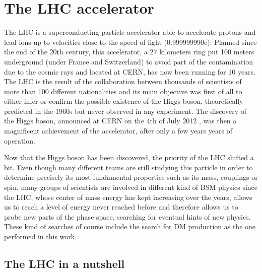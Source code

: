 \documentclass[a4paper, 10pt, openright]{report}
\begin{document}
\section{The \ac{LHC} accelerator} \label{section:LHC}

The \acf{LHC} is a superconducting particle accelerator able to accelerate protons and lead ions up to velocities close to the speed of light (0.999999990c). Planned since the end of the 20th century, this accelerator, a 27 kilometers ring put 100 meters underground (under France and Switzerland) to avoid part of the contamination due to the cosmic rays and located at \ac{CERN}, has now been running for 10 years. The \ac{LHC} is the result of the collaboration between thousands of scientists of more than 100 different nationalities and its main objective was first of all to either infer or confirm the possible existence of the Higgs boson, theoretically predicted in the 1960s \cite{HiggsPostulate1, HiggsPostulate2} but never observed in any experiment. The discovery of the Higgs boson, announced at \ac{CERN} on the 4th of July 2012 \cite{HiggsDiscovery1, HiggsDiscovery2}, was then a magnificent achievement of the accelerator, after only a few years years of operation.

Now that the Higgs boson has been discovered, the priority of the \ac{LHC} shifted a bit. Even though many different teams are still studying this particle in order to determine precisely its most fundamental properties such as its mass, couplings or spin, many groups of scientists are involved in different kind of \ac{BSM} physics since the \ac{LHC}, whose center of mass energy has kept increasing over the years, allows us to reach a level of energy never reached before and therefore allows us to probe new parts of the phase space, searching for eventual hints of new physics. These kind of searches of course include the search for \ac{DM} production as the one performed in this work. 


\subsection{The \ac{LHC} in a nutshell}\label{section:LHCNut}
\end{document}
